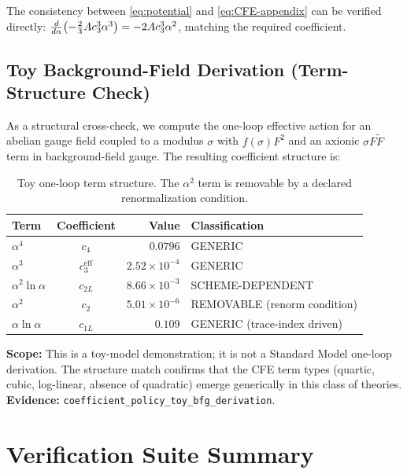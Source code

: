 \begin{remark}
The consistency between \eqref{eq:potential} and \eqref{eq:CFE-appendix} can be 
verified directly: $\frac{d}{d\alpha}\bigl(-\frac{2}{3}Ac_3^3\alpha^3\bigr) 
= -2Ac_3^3\alpha^2$, matching the required coefficient.
\end{remark}

\subsection{Toy Background-Field Derivation (Term-Structure Check)}
\label{sec:toy-bfg}

As a structural cross-check, we compute the one-loop effective action for an
abelian gauge field coupled to a modulus $\sigma$ with $f(\sigma)F^2$ and an
axionic $\sigma F\tilde{F}$ term in background-field gauge.
The resulting coefficient structure is:

\begin{table}[H]
\centering\small
\begin{tabular}{@{}lcrl@{}}
\toprule
Term & Coefficient & Value & Classification\\
\midrule
$\alpha^4$              & $c_4$        & $0.0796$  & GENERIC\\
$\alpha^3$              & $c_3^{\text{eff}}$ & $2.52\times10^{-4}$ & GENERIC\\
$\alpha^2\ln\alpha$     & $c_{2L}$     & $8.66\times10^{-3}$ & SCHEME-DEPENDENT\\
$\alpha^2$              & $c_2$        & $5.01\times10^{-6}$ & REMOVABLE (renorm condition)\\
$\alpha\ln\alpha$       & $c_{1L}$     & $0.109$  & GENERIC (trace-index driven)\\
\bottomrule
\end{tabular}
\caption{Toy one-loop term structure.
  The $\alpha^2$ term is removable by a declared renormalization condition.}
\label{tab:toy-bfg}
\end{table}

\textbf{Scope:} This is a toy-model demonstration; it is not a Standard Model one-loop derivation.
The structure match confirms that the CFE term types (quartic, cubic, log-linear, absence of
quadratic) emerge generically in this class of theories.
\textbf{Evidence:} \texttt{coefficient\_policy\_toy\_bfg\_derivation}.

\section{Verification Suite Summary}

